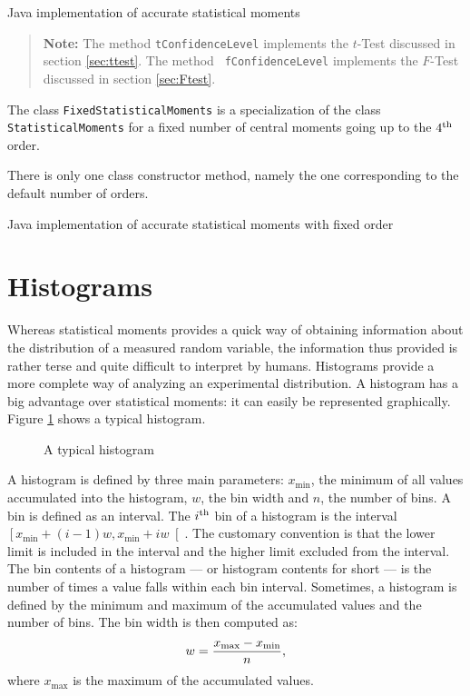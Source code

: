 \documentclass[twoside]{book}
\begin{document}
\begin{listing} Java implementation of accurate statistical moments \label{lj:genmoments}

\end{listing}
\begin{quote}
{\bf Note:} The method {\tt tConfidenceLevel} implements the
$t$-Test discussed in section \ref{sec:ttest}. The method {\tt
fConfidenceLevel} implements the $F$-Test discussed in section
\ref{sec:Ftest}.
\end{quote}

The class {\tt FixedStatisticalMoments} is a specialization of the
class {\tt StatisticalMoments} for a fixed number of central
moments going up to the $4^{\mathop{\rm th}}$ order.

There is only one class constructor method, namely the one
corresponding to the default number of orders.

\begin{listing} Java implementation of accurate statistical moments with fixed order\label{lj:fixedmoments}

\end{listing}

\section{Histograms}
\label{sec:histogram} Whereas statistical moments provides a quick
way of obtaining information about the distribution of a measured
random variable, the information thus provided is rather terse and
quite difficult to interpret by humans. Histograms provide a more
complete way of analyzing an experimental distribution. A
histogram has a big advantage over statistical moments: it can
easily be represented graphically. Figure \ref{fig:histogram}
shows a typical histogram.
\begin{figure}
\center{} \caption{A
typical histogram}\label{fig:histogram}
\end{figure}

A histogram is defined by three main parameters: $x_{\min}$, the
minimum of all values accumulated into the histogram, $w$, the bin
width and $n$, the number of bins. A bin is defined as an
interval. The $i^{\mathop{\rm th}}$ bin of a histogram is the interval $\left[
x_{\min}+\left(i-1\right)w, x_{\min}+iw\right[$. The customary
convention is that the lower limit is included in the interval and
the higher limit excluded from the interval. The bin contents of a
histogram --- or histogram contents for short --- is the number of
times a value falls within each bin interval. Sometimes, a
histogram is defined by the minimum and maximum of the accumulated
values and the number of bins. The bin width is then computed as:
\begin{equation}
  w = {x_{\max} - x_{\min} \over n},
\end{equation}
where $x_{\max}$ is the maximum of the accumulated values.
\end{document}
